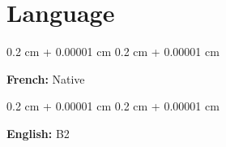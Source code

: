 \documentclass[10pt, letterpaper]{article}
\newenvironment{onecolentry}{
    \begin{adjustwidth}{
        0.2 cm + 0.00001 cm
    }{
        0.2 cm + 0.00001 cm
    }
}{
    \end{adjustwidth}
} %
\begin{document}
    \section{Language}
        \begin{onecolentry}
            \textbf{French:} Native
        \end{onecolentry}
        \vspace{0.2 cm}

        \begin{onecolentry}
            \textbf{English:} B2
        \end{onecolentry}
        \vspace{0.2 cm}



\end{document}
